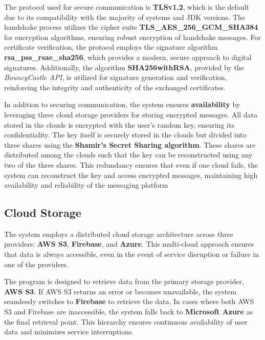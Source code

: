 \documentclass[a4paper,openright,twoside,11pt]{report}
\begin{document}
The protocol used for secure communication is \textbf{TLSv1.2}, which is the default due to its compatibility with the majority of systems and JDK versions. The handshake process utilizes the cipher suite \textbf{TLS\_AES\_256\_GCM\_SHA384} for encryption algorithms, ensuring robust encryption of handshake messages. For certificate verification, the protocol employs the signature algorithm \textbf{rsa\_pss\_rsae\_sha256}, which provides a modern, secure approach to digital signatures. Additionally, the algorithm \textbf{SHA256withRSA}, provided by the \textit{BouncyCastle API}, is utilized for signature generation and verification, reinforcing the integrity and authenticity of the exchanged certificates.
\newline

In addition to securing communication, the system ensures \textbf{availability} by leveraging three cloud storage providers for storing encrypted messages. All data stored in the clouds is encrypted with the user's random key, ensuring its confidentiality. The key itself is securely stored in the clouds but divided into three shares using the \textbf{Shamir's Secret Sharing algorithm}. These shares are distributed among the clouds such that the key can be reconstructed using any two of the three shares. This redundancy ensures that even if one cloud fails, the system can reconstruct the key and access encrypted messages, maintaining high availability and reliability of the messaging platform

\subsection*{Cloud Storage}

The system employs a distributed cloud storage architecture across three providers: \textbf{AWS S3}, \textbf{Firebase}, and \textbf{Azure}. This multi-cloud approach ensures that data is always accessible, even in the event of service disruption or failure in one of the providers.

The program is designed to retrieve data from the primary storage provider, \textbf{AWS S3}. If AWS S3 returns an error or becomes unavailable, the system seamlessly switches to \textbf{Firebase} to retrieve the data. In cases where both AWS S3 and Firebase are inaccessible, the system falls back to \textbf{Microsoft Azure} as the final retrieval point. This hierarchy ensures continuous availability of user data and minimizes service interruptions.
\end{document}

